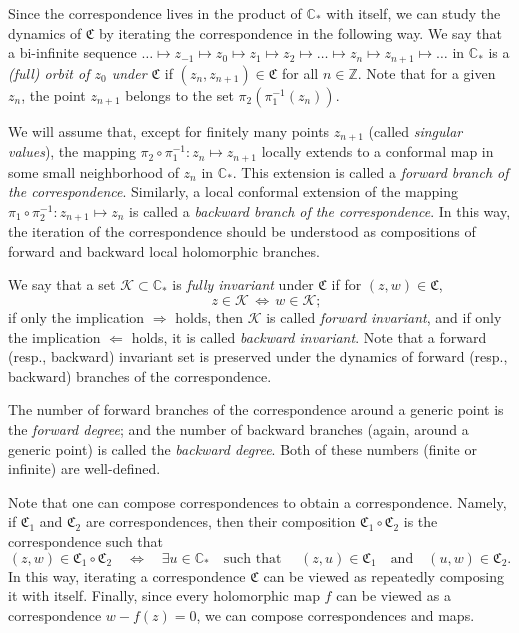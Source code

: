 \documentclass[11pt,a4paper, oneside]{amsart}
\theoremstyle{definition}
\theoremstyle{remark}
\numberwithin{equation}{section}
\newcommand{\frakC}{\mathfrak{C}}
\newcommand{\C}{\mathbb{C}}
\begin{document}
Since the correspondence lives in the product of $\C_*$ with itself, we can study the dynamics of $\frakC$ by iterating the correspondence in the following way. We say that a bi-infinite sequence $\ldots \mapsto z_{-1} \mapsto z_0 \mapsto z_1 \mapsto z_2 \mapsto\ldots\mapsto z_n \mapsto z_{n+1} \mapsto \ldots$ in $\C_*$ is a \emph{(full) orbit of $z_0$ under $\frakC$} if $(z_n, z_{n+1}) \in \frakC$ for all $n \in \mathbb Z$. Note that for a given $z_n$, the point $z_{n+1}$ belongs to the set $\pi_2\left(\pi_1^{-1}(z_n)\right)$.

We will assume that, except for finitely many points $z_{n+1}$ (called \emph{singular values}), the mapping $\pi_2 \circ \pi_1^{-1} \colon z_n \mapsto z_{n+1}$ locally extends to a conformal map in some small neighborhood of $z_{n}$ in $\C_*$. This extension is called a \emph{forward branch of the correspondence}. Similarly, a local conformal extension of the mapping $\pi_1 \circ \pi_2^{-1} \colon z_{n+1} \mapsto z_n$ is called a \emph{backward branch of the correspondence}. In this way, the iteration of the correspondence should be understood as compositions of forward and backward local holomorphic branches. 

We say that a set $\mathcal K \subset \C_*$ is \emph{fully invariant} under $\frakC$ if for $(z,w) \in \frakC$,
\[
\quad z \in \mathcal K \, \Longleftrightarrow \,  w \in \mathcal K;
\]
if only the implication $\Rightarrow$ holds, then $\mathcal K$ is called \emph{forward invariant}, and if only the implication $\Leftarrow$ holds, it is called \emph{backward invariant}. Note that a forward (resp., backward) invariant set is preserved under the dynamics of forward (resp., backward) branches of the correspondence.

 
The number of forward branches of the correspondence around a generic point is the \emph{forward degree}; and the number of backward branches (again, around a generic point) is called the \emph{backward degree}. Both of these numbers (finite or infinite) are well-defined.

Note that one can compose correspondences to obtain a correspondence. Namely, if $\frakC_1$ and $\frakC_2$ are correspondences, then their composition $\frakC_1\circ\frakC_2$ is the correspondence such that
\[
(z,w) \in \frakC_1 \circ \frakC_2 \quad \Longleftrightarrow \quad \exists u \in \C_* \quad \text{such that } \quad (z,u) \in \frakC_1 \quad \text{and} \quad (u,w)\in \frakC_2.
\]
In this way, iterating a correspondence $\frakC$ can be viewed as repeatedly composing it with itself. Finally, since every holomorphic map $f$ can be viewed as a correspondence $w-f(z)=0$, we can compose correspondences and maps.
\end{document}
